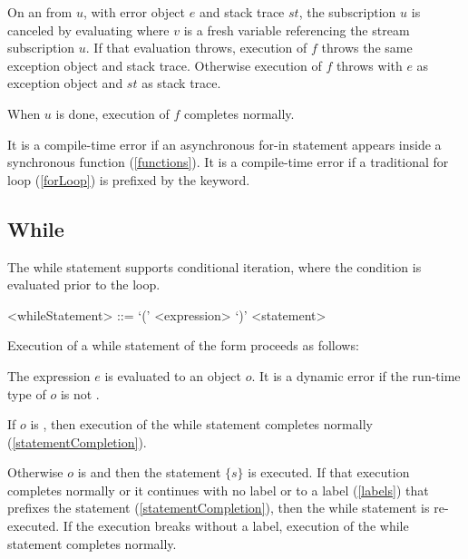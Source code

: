 \documentclass[makeidx]{article}
\begin{document}
{\LMHash{}%
On an  from $u$,
with error object $e$ and stack trace $st$,
the subscription $u$ is canceled by evaluating 
where $v$ is a fresh variable referencing the stream subscription $u$.
If that evaluation throws,
execution of $f$ throws the same exception object and stack trace.
Otherwise execution of $f$ throws
with $e$ as exception object and $st$ as stack trace.

\LMHash{}%
When $u$ is done, execution of $f$ completes normally.

\LMHash{}%
It is a compile-time error if an asynchronous for-in statement appears
inside a synchronous function (\ref{functions}).
It is a compile-time error if a traditional for loop (\ref{forLoop}) is
prefixed by the \AWAIT{} keyword.



\subsection{While}

\LMHash{}%
The while statement supports conditional iteration,
where the condition is evaluated prior to the loop.

\begin{grammar}
<whileStatement> ::= \WHILE{} `(' <expression> `)' <statement>
\end{grammar}

\LMHash{}%
Execution of a while statement of the form 
proceeds as follows:

\LMHash{}%
The expression $e$ is evaluated to an object $o$.
It is a dynamic error if the run-time type of $o$ is not .

\LMHash{}%
If $o$ is \FALSE, then execution of the while statement completes normally
(\ref{statementCompletion}).

\LMHash{}%
Otherwise $o$ is \TRUE{} and then the statement $\{s\}$ is executed.
If that execution completes normally or it continues with no label
or to a label (\ref{labels}) that prefixes the \WHILE{} statement
(\ref{statementCompletion}),
then the while statement is re-executed.
If the execution breaks without a label,
execution of the while statement completes normally.

}
\end{document}
